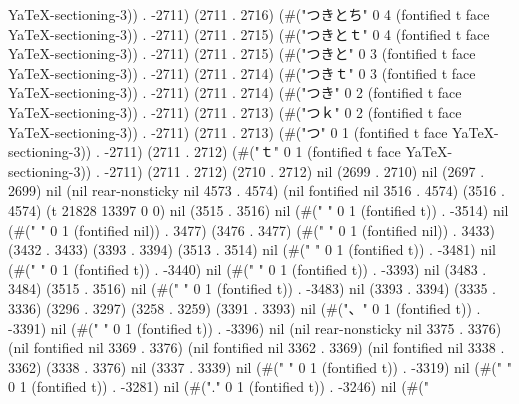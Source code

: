 YaTeX-sectioning-3)) . -2711) (2711 . 2716) (#("つきとち" 0 4 (fontified t face YaTeX-sectioning-3)) . -2711) (2711 . 2715) (#("つきとｔ" 0 4 (fontified t face YaTeX-sectioning-3)) . -2711) (2711 . 2715) (#("つきと" 0 3 (fontified t face YaTeX-sectioning-3)) . -2711) (2711 . 2714) (#("つきｔ" 0 3 (fontified t face YaTeX-sectioning-3)) . -2711) (2711 . 2714) (#("つき" 0 2 (fontified t face YaTeX-sectioning-3)) . -2711) (2711 . 2713) (#("つｋ" 0 2 (fontified t face YaTeX-sectioning-3)) . -2711) (2711 . 2713) (#("つ" 0 1 (fontified t face YaTeX-sectioning-3)) . -2711) (2711 . 2712) (#("ｔ" 0 1 (fontified t face YaTeX-sectioning-3)) . -2711) (2711 . 2712) (2710 . 2712) nil (2699 . 2710) nil (2697 . 2699) nil (nil rear-nonsticky nil 4573 . 4574) (nil fontified nil 3516 . 4574) (3516 . 4574) (t 21828 13397 0 0) nil (3515 . 3516) nil (#("
" 0 1 (fontified t)) . -3514) nil (#(" " 0 1 (fontified nil)) . 3477) (3476 . 3477) (#(" " 0 1 (fontified nil)) . 3433) (3432 . 3433) (3393 . 3394) (3513 . 3514) nil (#("
" 0 1 (fontified t)) . -3481) nil (#("
" 0 1 (fontified t)) . -3440) nil (#("
" 0 1 (fontified t)) . -3393) nil (3483 . 3484) (3515 . 3516) nil (#("
" 0 1 (fontified t)) . -3483) nil (3393 . 3394) (3335 . 3336) (3296 . 3297) (3258 . 3259) (3391 . 3393) nil (#("、" 0 1 (fontified t)) . -3391) nil (#("
" 0 1 (fontified t)) . -3396) nil (nil rear-nonsticky nil 3375 . 3376) (nil fontified nil 3369 . 3376) (nil fontified nil 3362 . 3369) (nil fontified nil 3338 . 3362) (3338 . 3376) nil (3337 . 3339) nil (#("
" 0 1 (fontified t)) . -3319) nil (#("
" 0 1 (fontified t)) . -3281) nil (#("." 0 1 (fontified t)) . -3246) nil (#("
